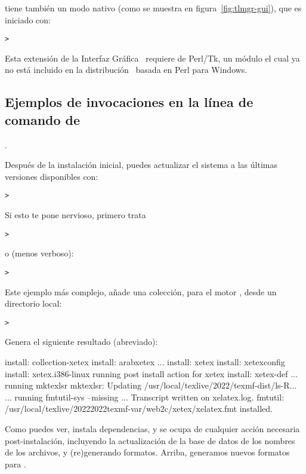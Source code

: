 \documentclass{article}
\begin{document}
 tiene también un modo nativo \GUI{}
(como se muestra en figura~\ref{fig:tlmgr-gui}), que es iniciado con:
\begin{alltt}
> 
\end{alltt}

Esta extensión de la Interfaz Gráfica \GUI\ requiere de
Perl/Tk, un módulo el cual ya no está incluido en la
distribución \TL\ basada en Perl para Windows.

\subsection{Ejemplos de invocaciones en la línea de comando de
}. 

Después de la instalación inicial, puedes actualizar el sistema a las
últimas versiones disponibles con: 
\begin{alltt}
> 
\end{alltt}
Si esto te pone nervioso, primero trata
\begin{alltt}
> 
\end{alltt}
o (menos verboso):
\begin{alltt}
> 
\end{alltt}

Este ejemplo más complejo, añade una colección, para el motor \XeTeX,
desde un directorio local:

\begin{alltt}
> 
\end{alltt}
Genera el siguiente resultado (abreviado):
\begin{fverbatim}
install: collection-xetex
install: arabxetex
...
install: xetex
install: xetexconfig
install: xetex.i386-linux
running post install action for xetex
install: xetex-def
...
running mktexlsr
mktexlsr: Updating /usr/local/texlive/2022/texmf-dist/ls-R...
...
running fmtutil-sys --missing
...
Transcript written on xelatex.log.
fmtutil: /usr/local/texlive/20222022texmf-var/web2c/xetex/xelatex.fmt installed.
\end{fverbatim}

Como puedes ver,  instala dependencias, y se ocupa de
cualquier acción necesaria post-instalación, incluyendo la
actualización de la base de datos de los nombres de los archivos, y
(re)generando formatos. Arriba, generamos nuevos formatos para \XeTeX.
\end{document}

